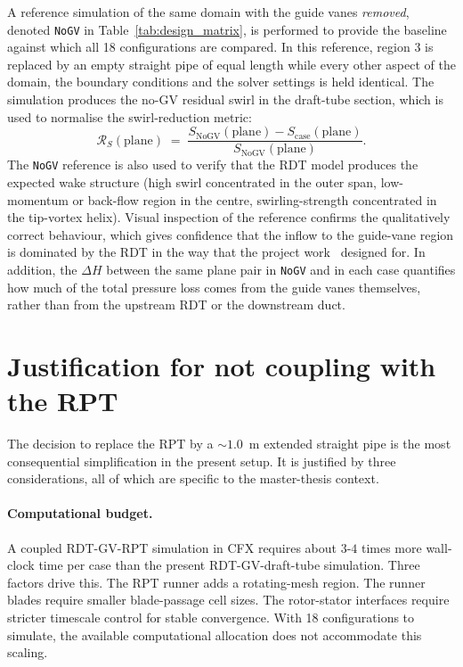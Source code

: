 A reference simulation of the same domain with the guide vanes \emph{removed}, denoted \texttt{NoGV} in Table~\ref{tab:design_matrix}, is performed to provide the baseline against which all 18 configurations are compared. In this reference, region 3 is replaced by an empty straight pipe of equal length while every other aspect of the domain, the boundary conditions and the solver settings is held identical. The simulation produces the no-GV residual swirl in the draft-tube section, which is used to normalise the swirl-reduction metric:
\begin{equation}
\mathcal{R}_S(\mathrm{plane}) \;=\; \frac{S_{\mathrm{NoGV}}(\mathrm{plane}) - S_{\mathrm{case}}(\mathrm{plane})}{S_{\mathrm{NoGV}}(\mathrm{plane})}.
\label{eq:swirl_reduction}
\end{equation}
The \texttt{NoGV} reference is also used to verify that the RDT model produces the expected wake structure (high swirl concentrated in the outer span, low-momentum or back-flow region in the centre, swirling-strength concentrated in the tip-vortex helix). Visual inspection of the reference confirms the qualitatively correct behaviour, which gives confidence that the inflow to the guide-vane region is dominated by the RDT in the way that the project work~\cite{Leonsen2025} designed for. In addition, the $\Delta H$ between the same plane pair in \texttt{NoGV} and in each case quantifies how much of the total pressure loss comes from the guide vanes themselves, rather than from the upstream RDT or the downstream duct.
 
\section{Justification for not coupling with the RPT}
\label{sec:rpt-decoupling-justification}
 
The decision to replace the RPT by a $\sim 1.0$~m extended straight pipe is the most consequential simplification in the present setup. It is justified by three considerations, all of which are specific to the master-thesis context.
 
\paragraph{Computational budget.} A coupled RDT-GV-RPT simulation in CFX requires about $3$-$4$ times more wall-clock time per case than the present RDT-GV-draft-tube simulation. Three factors drive this. The RPT runner adds a rotating-mesh region. The runner blades require smaller blade-passage cell sizes. The rotor-stator interfaces require stricter timescale control for stable convergence. With 18 configurations to simulate, the available computational allocation does not accommodate this scaling.
 
